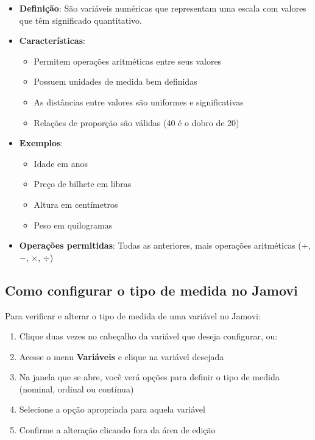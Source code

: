 \begin{itemize}
    \item \textbf{Definição}: São variáveis numéricas que representam uma escala com valores que têm significado quantitativo.
    \item \textbf{Características}:
    \begin{itemize}
        \item Permitem operações aritméticas entre seus valores
        \item Possuem unidades de medida bem definidas
        \item As distâncias entre valores são uniformes e significativas
        \item Relações de proporção são válidas (40 é o dobro de 20)
    \end{itemize}
    \item \textbf{Exemplos}:
    \begin{itemize}
        \item Idade em anos
        \item Preço de bilhete em libras
        \item Altura em centímetros
        \item Peso em quilogramas
    \end{itemize}
    \item \textbf{Operações permitidas}: Todas as anteriores, mais operações aritméticas ($+$, $-$, $\times$, $\div$)
\end{itemize}

\subsection{Como configurar o tipo de medida no Jamovi}

Para verificar e alterar o tipo de medida de uma variável no Jamovi:

\begin{enumerate}
    \item Clique duas vezes no cabeçalho da variável que deseja configurar, ou:
    \item Acesse o menu \textbf{Variáveis} e clique na variável desejada
    \item Na janela que se abre, você verá opções para definir o tipo de medida (nominal, ordinal ou contínua)
    \item Selecione a opção apropriada para aquela variável
    \item Confirme a alteração clicando fora da área de edição
\end{enumerate}

